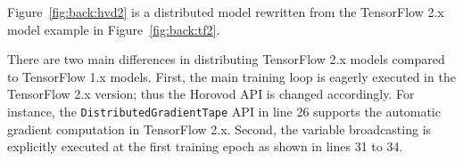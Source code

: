Figure~\ref{fig:back:hvd2} is a distributed model rewritten from the
TensorFlow 2.x model example in Figure~\ref{fig:back:tf2}.
\begin{inred}
There are two main differences in distributing TensorFlow 2.x models compared to
TensorFlow 1.x models.
First, the main training loop is eagerly executed in the TensorFlow 2.x version;
thus the Horovod API is changed accordingly.
For instance, the {\tt DistributedGradientTape} API in line 26
supports the automatic gradient computation in TensorFlow 2.x.
Second, the variable broadcasting is explicitly executed at the first training
epoch as shown in lines 31 to 34.
\end{inred}

